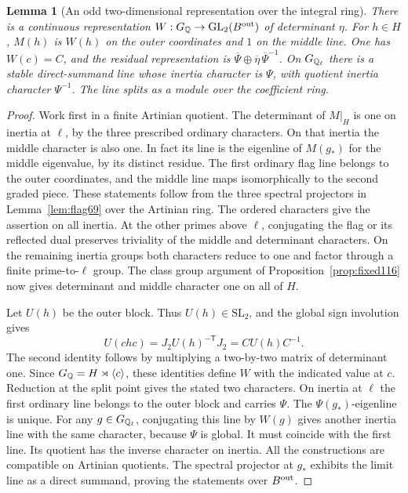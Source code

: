 \documentclass[a4paper,11pt]{article}
\newtheorem{lemma}[proposition]{Lemma}
\theoremstyle{definition}
\theoremstyle{remark}
\numberwithin{equation}{section}
\begin{document}
\begin{lemma}[An odd two-dimensional representation over the integral ring]
\label{lem:outer117}
There is a continuous representation
\(W:G_\mathbb Q\to\mathrm{GL}_2(B^{\rm out})\) of determinant \(\eta\).
For \(h\in H\), \(M(h)\) is \(W(h)\) on the outer coordinates
and \(1\) on the middle line. One has \(W(c)=C\), and the
residual representation is
\(\overline\Psi\oplus\overline\eta\,\overline\Psi^{-1}\).
On \(G_{\mathbb Q_\ell}\) there is a stable direct-summand line
whose inertia character is \(\Psi\), with quotient inertia
character \(\Psi^{-1}\). The line splits as a module over the
coefficient ring.
\end{lemma}
\begin{proof}
Work first in a finite Artinian quotient. The determinant of
\(M|_H\) is one on inertia at \(\ell\), by the three prescribed
ordinary characters. On that inertia the middle character is
also one. In fact its line is the eigenline of \(M(g_*)\) for
the middle eigenvalue, by its distinct residue. The first
ordinary flag line belongs to the outer coordinates, and the
middle line maps isomorphically to the second graded piece.
These statements follow from the three spectral projectors
in Lemma~\ref{lem:flag69} over the Artinian ring. The ordered
characters give the assertion on all inertia. At the other
primes above \(\ell\), conjugating the flag or its reflected
dual preserves triviality of the middle and determinant
characters. On the remaining inertia groups both characters
reduce to one and factor through a finite prime-to-\(\ell\)
group. The class group argument of Proposition~\ref{prop:fixed116}
now gives determinant and middle character one on all of \(H\).

Let \(U(h)\) be the outer block. Thus \(U(h)\in\mathrm{SL}_2\),
and the global sign involution gives
\[
 U(chc)=J_2U(h)^{-\mathsf T}J_2=CU(h)C^{-1}.
\]
The second identity follows by multiplying a two-by-two matrix
of determinant one. Since \(G_\mathbb Q=H\rtimes\langle c\rangle\),
these identities define \(W\) with the indicated value at \(c\).
Reduction at the split point gives the stated two characters.
On inertia at \(\ell\) the first ordinary line belongs to the
outer block and carries \(\Psi\). The \(\Psi(g_*)\)-eigenline is
unique. For any \(g\in G_{\mathbb Q_\ell}\), conjugating this line by
\(W(g)\) gives another inertia line with the same character,
because \(\Psi\) is global. It must coincide with the first
line. Its quotient has the inverse character on inertia.
All the constructions are compatible on Artinian quotients.
The spectral projector at \(g_*\) exhibits the limit line as
a direct summand, proving the statements over \(B^{\rm out}\).
\end{proof}
\end{document}
